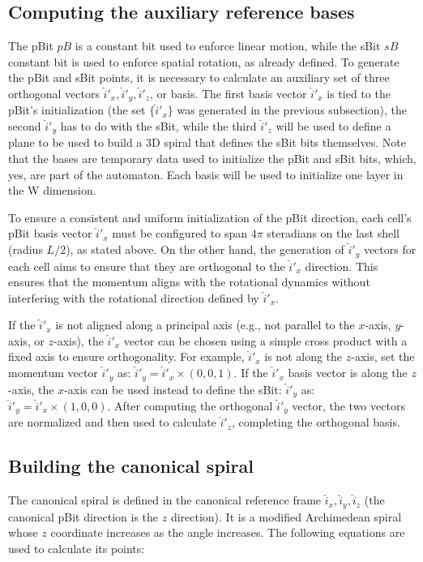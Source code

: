 \documentclass[12pt]{article}
\begin{document}
\subsection{Computing the auxiliary reference bases}
The pBit $pB$ is a constant bit used to enforce linear motion, while the sBit $sB$ constant bit is used to enforce spatial rotation, as already defined. To generate the pBit and sBit points, it is necessary to calculate an auxiliary set of three orthogonal vectors $\hat{i}'_x,\hat{i}'_y,\hat{i}'_z$, or basis. The first basis vector $\hat{i}'_x$ is tied to the pBit's initialization (the set $\{\hat{i}'_x\}$ was generated in the previous subsection), the second $\hat{i}'_y$ has to do with the sBit, while the third $\hat{i}'_z$ will be used to define a plane to be used to build a 3D spiral that defines the sBit bits themselves. Note that the bases are temporary data used to initialize the pBit and sBit bits, which, yes, are part of the automaton. Each basis will be used to initialize one layer in the W dimension.

To ensure a consistent and uniform initialization of the pBit direction, each cell's pBit basis vector $\hat{i}'_x$ must be configured to span $4\pi$ steradians on the last shell (radius $L/2$), as stated above. On the other hand, the generation of $\hat{i}'_y$ vectors for each cell aims to ensure that they are orthogonal to the $\hat{i}'_x$ direction. This ensures that the momentum aligns with the rotational dynamics without interfering with the rotational direction defined by $\hat{i}'_x$.

If the $\hat{i}'_x$ is not aligned along a principal axis (e.g., not parallel to the $x$-axis, $y$-axis, or $z$-axis), the $\hat{i}'_x$ vector can be chosen using a simple cross product with a fixed axis to ensure orthogonality. For example, $\hat{i}'_x$ is not along the $z$-axis, set the momentum vector $\hat{i}'_y$ as: $\hat{i}'_y=\hat{i}'_x\times(0,0,1)$. If the $\hat{i}'_x$ basis vector is along the $z$-axis, the $x$-axis can be used instead to define the sBit: $\hat{i}'_y$ as: $\hat{i}'_y=\hat{i}'_x\times(1,0,0)$. After computing the orthogonal $\hat{i}'_y$ vector, the two vectors are normalized and then used to calculate $\hat{i}'_z$, completing the orthogonal basis.

\subsection{Building the canonical spiral}

The canonical spiral is defined in the canonical reference frame $\hat{i}_x, \hat{i}_y, \hat{i}_z$ (the canonical pBit direction is the $z$ direction). It is a modified Archimedean spiral whose $z$ coordinate increases as the angle increases. The following equations are used to calculate its points:
\end{document}
